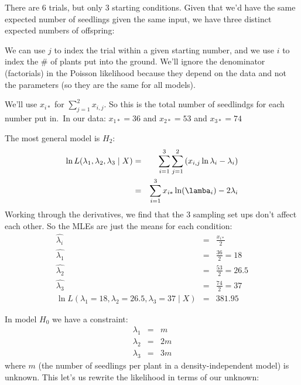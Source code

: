 \documentclass[11pt]{article}
\newcommand{\answer}[1]{{\color{red}#1}}
\begin{document}
\answer{
    There are 6 trials, but only 3 starting conditions. 
    Given that we'd have the same expected number of seedlings given the 
    same input, we have three distinct expected numbers of offspring:

We can use $j$ to index the trial within a given starting number, 
and we use $i$ to index the \# of plants put into the ground.
We'll ignore the denominator (factorials) in the Poisson likelihood
because they depend on the data and not the parameters (so they are the
    same for all models).

We'll use $x_{i\ast}$ for $\sum_{j=1}^2x_{i,j}$.
So this is the total number of seedlindgs for each number put in.\
In our data: $x_{1\ast}=36$  and $x_{2\ast}=53$ and $x_{3\ast}=74$ 

The most general model is $H_2$:
\begin{eqnarray}
\ln L(\lambda_1, \lambda_2, \lambda_3 \mid X) & = & \sum_{i=1}^{3}\sum_{j=1}^2
\left(x_{i,j} \ln \lambda_i - \lambda_i\right) \\
& = & \sum_{i=1}^{3}x_{i\ast}\ln(\lamba_i) - 2\lambda_i
\end{eqnarray}
Working through the derivatives, we find that the 3 sampling set ups don't affect
    each other.
So the MLEs are just the means for each condition:
\begin{eqnarray}
\widehat{\lambda_i} & = & \frac{x_{i\ast}}{2} \\
\widehat{\lambda_1} & = & \frac{36}{2} = 18 \\
\widehat{\lambda_2} & = & \frac{53}{2} = 26.5 \\
\widehat{\lambda_3} & = & \frac{74}{2} = 37 \\
\ln L(\lambda_1=18, \lambda_2=26.5, \lambda_3=37 \mid X) & = & 381.95
\end{eqnarray}

In model $H_0$ we have a constraint:
\begin{eqnarray}
{\lambda_1} & = & m \\
{\lambda_2} & = & 2m \\
{\lambda_3} & = & 3m 
\end{eqnarray}
where $m$ (the number of seedlings per plant in a density-independent model)
is unknown.
This let's us rewrite the likelihood in terms of our unknown:

}
\end{document}

